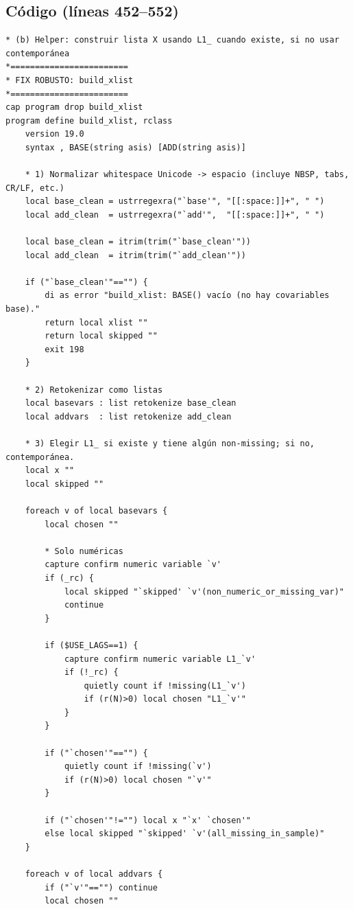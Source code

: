 \documentclass[12pt]{article}
\begin{document}
\subsection*{Código (líneas 452--552)}
\begin{lstlisting}
* (b) Helper: construir lista X usando L1_ cuando existe, si no usar contemporánea
*========================
* FIX ROBUSTO: build_xlist
*========================
cap program drop build_xlist
program define build_xlist, rclass
    version 19.0
    syntax , BASE(string asis) [ADD(string asis)]

    * 1) Normalizar whitespace Unicode -> espacio (incluye NBSP, tabs, CR/LF, etc.)
    local base_clean = ustrregexra("`base'", "[[:space:]]+", " ")
    local add_clean  = ustrregexra("`add'",  "[[:space:]]+", " ")

    local base_clean = itrim(trim("`base_clean'"))
    local add_clean  = itrim(trim("`add_clean'"))

    if ("`base_clean'"=="") {
        di as error "build_xlist: BASE() vacío (no hay covariables base)."
        return local xlist ""
        return local skipped ""
        exit 198
    }

    * 2) Retokenizar como listas
    local basevars : list retokenize base_clean
    local addvars  : list retokenize add_clean

    * 3) Elegir L1_ si existe y tiene algún non-missing; si no, contemporánea.
    local x ""
    local skipped ""

    foreach v of local basevars {
        local chosen ""

        * Solo numéricas
        capture confirm numeric variable `v'
        if (_rc) {
            local skipped "`skipped' `v'(non_numeric_or_missing_var)"
            continue
        }

        if ($USE_LAGS==1) {
            capture confirm numeric variable L1_`v'
            if (!_rc) {
                quietly count if !missing(L1_`v')
                if (r(N)>0) local chosen "L1_`v'"
            }
        }

        if ("`chosen'"=="") {
            quietly count if !missing(`v')
            if (r(N)>0) local chosen "`v'"
        }

        if ("`chosen'"!="") local x "`x' `chosen'"
        else local skipped "`skipped' `v'(all_missing_in_sample)"
    }

    foreach v of local addvars {
        if ("`v'"=="") continue
        local chosen ""


\end{lstlisting}
\end{document}
